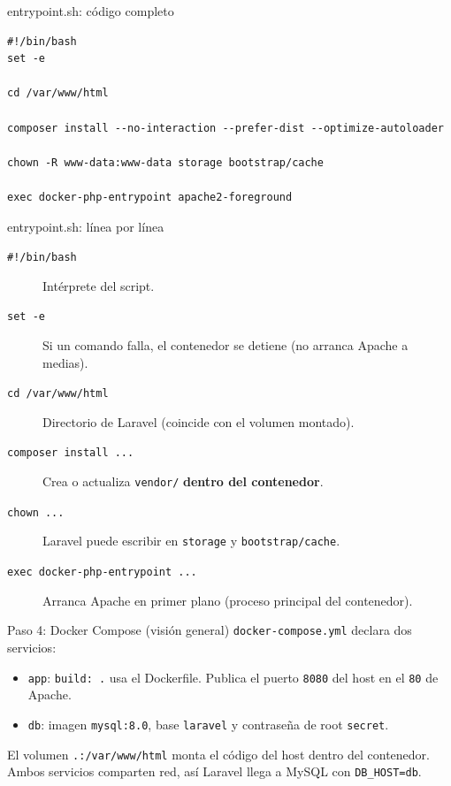 \documentclass[aspectratio=169,10pt]{beamer}
\begin{document}
\begin{frame}[fragile]{entrypoint.sh: código completo}
\begin{lstlisting}[style=codigo]
#!/bin/bash
set -e

cd /var/www/html

composer install --no-interaction --prefer-dist --optimize-autoloader

chown -R www-data:www-data storage bootstrap/cache

exec docker-php-entrypoint apache2-foreground
\end{lstlisting}
\end{frame}

\begin{frame}{entrypoint.sh: línea por línea}
  \small
  \begin{description}
    \item[\texttt{\#!/bin/bash}] Intérprete del script.
    \item[\texttt{set -e}] Si un comando falla, el contenedor se detiene (no arranca Apache a medias).
    \item[\texttt{cd /var/www/html}] Directorio de Laravel (coincide con el volumen montado).
    \item[\texttt{composer install ...}] Crea o actualiza \texttt{vendor/} \textbf{dentro del contenedor}.
    \item[\texttt{chown ...}] Laravel puede escribir en \texttt{storage} y \texttt{bootstrap/cache}.
    \item[\texttt{exec docker-php-entrypoint ...}] Arranca Apache en primer plano (proceso principal del contenedor).
  \end{description}
\end{frame}

\begin{frame}{Paso 4: Docker Compose (visión general)}
  \texttt{docker-compose.yml} declara dos servicios:
  \begin{itemize}
    \item \texttt{app}: \texttt{build: .} usa el Dockerfile. Publica el puerto \texttt{8080} del host en el \texttt{80} de Apache.
    \item \texttt{db}: imagen \texttt{mysql:8.0}, base \texttt{laravel} y contraseña de root \texttt{secret}.
  \end{itemize}
  \vspace{0.4em}
  El volumen \texttt{.:/var/www/html} monta el código del host dentro del contenedor. Ambos servicios comparten red, así Laravel llega a MySQL con \texttt{DB\_HOST=db}.
\end{frame}
\end{document}
